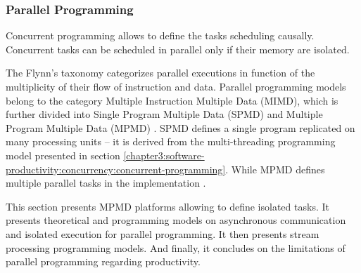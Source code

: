 



\subsubsection{Parallel Programming} \label{chapter3:software-efficiency:concurrency:parallel-programming}


Concurrent programming allows to define the tasks scheduling causally.
Concurrent tasks can be scheduled in parallel only if their memory are isolated.

The Flynn's taxonomy \cite{Flynn1972} categorizes parallel executions in function of the multiplicity of their flow of instruction and data.
Parallel programming models belong to the category Multiple Instruction Multiple Data (MIMD), which is further divided into Single Program Multiple Data (SPMD) \cite{Auguin1983,Darema1988,Darema2001} and Multiple Program Multiple Data (MPMD) \cite{Chang1997,Chan2004}.
SPMD defines a single program replicated on many processing units \cite{Culler,Johnson1995,K.ManiChandy2005} -- it is derived from the multi-threading programming model presented in section \ref{chapter3:software-productivity:concurrency:concurrent-programming}.
While MPMD defines multiple parallel tasks in the implementation \cite{Grimshaw1991,Foster1995b,Foster1996}.



This section presents MPMD platforms allowing to define isolated tasks.
It presents theoretical and programming models on asynchronous communication and isolated execution for parallel programming.
It then presents stream processing programming models.
And finally, it concludes on the limitations of parallel programming regarding productivity. 




